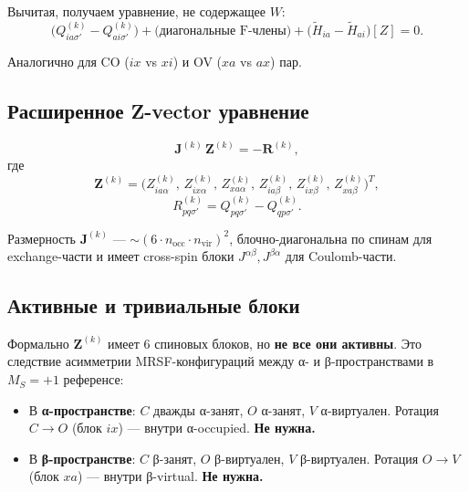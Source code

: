 \documentclass[11pt, a4paper]{article}
\theoremstyle{definition}
\newcommand{\Zk}[2]{Z^{(#1)}_{#2}}
\newcommand{\nocc}{n_{\text{occ}}}
\newcommand{\nvir}{n_{\text{vir}}}
\begin{document}
Вычитая, получаем уравнение, не содержащее $W$:
\begin{equation}
    \bigl( Q^{(k)}_{ia\sigma'} - Q^{(k)}_{ai\sigma'} \bigr) + \bigl( \text{диагональные F-члены} \bigr) + \bigl( \tilde H_{ia} - \tilde H_{ai} \bigr)[Z] = 0.
\end{equation}

Аналогично для CO ($ix$ vs $xi$) и OV ($xa$ vs $ax$) пар.

\subsection{Расширенное Z-vector уравнение}

\begin{equation}
    \boxed{\; \mathbf J^{(k)}\, \mathbf Z^{(k)} = -\mathbf R^{(k)}, \;}
    \label{eq:Zvec}
\end{equation}
где
\begin{equation}
    \mathbf Z^{(k)} = \bigl( \Zk{k}{ia\alpha},\, \Zk{k}{ix\alpha},\, \Zk{k}{xa\alpha},\, \Zk{k}{ia\beta},\, \Zk{k}{ix\beta},\, \Zk{k}{xa\beta} \bigr)^T,
\end{equation}
\begin{equation}
    R^{(k)}_{pq\sigma'} = Q^{(k)}_{pq\sigma'} - Q^{(k)}_{qp\sigma'}.
    \label{eq:Rdef}
\end{equation}

Размерность $\mathbf J^{(k)}$ --- $\sim (6 \cdot \nocc \cdot \nvir)^2$, блочно-диагональна по спинам для exchange-части и имеет cross-spin блоки $J^{\alpha\beta}, J^{\beta\alpha}$ для Coulomb-части.

\subsection{Активные и тривиальные блоки}

Формально $\mathbf Z^{(k)}$ имеет 6 спиновых блоков, но \textbf{не все они активны}. Это следствие асимметрии MRSF-конфигураций между α- и β-пространствами в $M_S = +1$ референсе:

\begin{itemize}
    \item В \textbf{α-пространстве}: $C$ дважды α-занят, $O$ α-занят, $V$ α-виртуален. Ротация $C \to O$ (блок $ix$) --- внутри α-occupied. \textbf{Не нужна.}
    \item В \textbf{β-пространстве}: $C$ β-занят, $O$ β-виртуален, $V$ β-виртуален. Ротация $O \to V$ (блок $xa$) --- внутри β-virtual. \textbf{Не нужна.}
\end{itemize}
\end{document}
